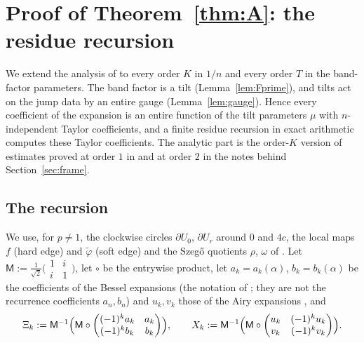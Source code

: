 \section{Proof of Theorem~\ref{thm:A}: the residue recursion}\label{sec:natural}

We extend the analysis of \cite{PaperII} to every order $K$ in $1/n$ and every order $T$ in the band-factor parameters. The band
factor is a tilt (Lemma~\ref{lem:Fprime}), and tilts act on the jump data by an entire gauge (Lemma~\ref{lem:gauge}). Hence every coefficient
of the expansion is an entire function of the tilt parameters $\mu$ with $n$-independent Taylor coefficients, and a finite residue
recursion in exact arithmetic computes these Taylor coefficients. The analytic part is the order-$K$ version of estimates proved at order $1$ in
\cite{PaperII} and at order $2$ in the notes behind Section~\ref{sec:frame}.

\subsection{The recursion}\label{sec:recursion}
We use, for $p\ne1$, the clockwise circles $\partial U_0$, $\partial U_r$ around $0$ and $4c$, the local maps $f$ (hard edge) and
$\tilde\varphi$ (soft edge) and the Szeg\H{o} quotients $\rho$, $\omega$ of \cite[Sections~8--10]{PaperII}. Let
$\mathsf M:=\frac1{\sqrt2}\bigl(\begin{smallmatrix}1&i\\i&1\end{smallmatrix}\bigr)$, let $\circ$ be the entrywise product, let $a_k=a_k(\alpha)$,
$b_k=b_k(\alpha)$ be the coefficients of the Bessel expansions \cite[(10.17.1), (10.17.8)]{DLMF} (the notation of \cite{DLMF}; they are not the recurrence coefficients $a_n,b_n$) and $u_k,v_k$ those of the Airy expansions
\cite[(9.7.2)]{DLMF}, and
\[
  \Xi_k:=\mathsf M^{-1}\Bigl(\mathsf M\circ\begin{pmatrix}(-1)^ka_k&a_k\\(-1)^kb_k&b_k\end{pmatrix}\Bigr),\qquad
  X_k:=\mathsf M^{-1}\Bigl(\mathsf M\circ\begin{pmatrix}u_k&(-1)^ku_k\\v_k&(-1)^kv_k\end{pmatrix}\Bigr).
\]

